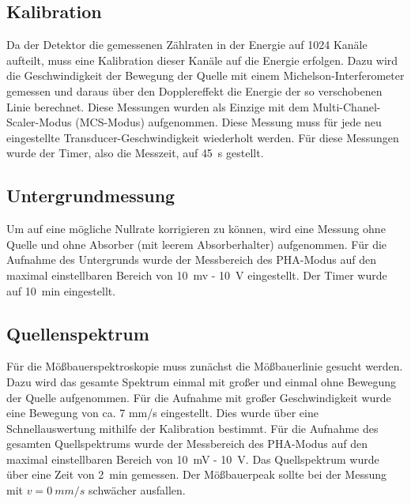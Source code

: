 \documentclass[12pt,a4paper]{article}
\begin{document}
\subsection{Kalibration}
Da der Detektor die gemessenen Zählraten in der Energie auf 1024 Kanäle aufteilt, muss eine Kalibration dieser Kanäle auf die Energie erfolgen. Dazu wird die Geschwindigkeit der Bewegung der Quelle mit einem Michelson-Interferometer gemessen und daraus über den Dopplereffekt die Energie der so verschobenen Linie berechnet. Diese Messungen wurden als Einzige mit dem Multi-Chanel-Scaler-Modus (MCS-Modus) aufgenommen. Diese Messung muss für jede neu eingestellte Transducer-Geschwindigkeit wiederholt werden. Für diese Messungen wurde der Timer, also die Messzeit, auf \SI{45}{s} gestellt.

\subsection{Untergrundmessung}
Um auf eine mögliche Nullrate korrigieren zu können, wird eine Messung ohne Quelle und ohne Absorber (mit leerem Absorberhalter) aufgenommen. Für die Aufnahme des Untergrunds wurde der Messbereich des PHA-Modus auf den maximal einstellbaren Bereich von \SI{10}{mv} - \SI{10}{V} eingestellt. Der Timer wurde auf \SI{10}{min} eingestellt.

\subsection{Quellenspektrum}
Für die Mößbauerspektroskopie muss zunächst die Mößbauerlinie gesucht werden. Dazu wird das gesamte Spektrum einmal mit großer und einmal ohne Bewegung der Quelle aufgenommen. Für die Aufnahme mit großer Geschwindigkeit wurde eine Bewegung von ca. 7 mm/s eingestellt. Dies wurde über eine Schnellauswertung mithilfe der Kalibration bestimmt. Für die Aufnahme des gesamten Quellspektrums wurde der Messbereich des PHA-Modus auf den maximal einstellbaren Bereich von \SI{10}{mV} - \SI{10}{V}. Das Quellspektrum wurde über eine Zeit von \SI{2}{min} gemessen. Der Mößbauerpeak sollte bei der Messung mit $v = \SI{0}{mm/s}$ schwächer ausfallen.
\end{document}
